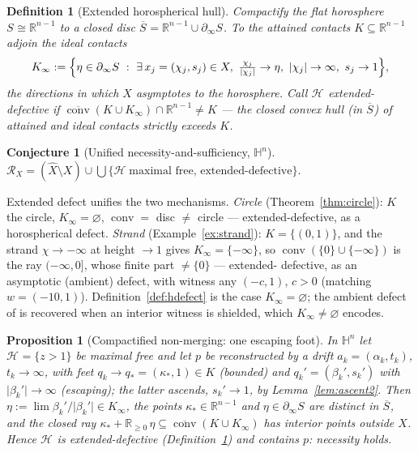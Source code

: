 \documentclass[11pt]{article}
\newtheorem{proposition}[theorem]{Proposition}
\newtheorem{definition}[theorem]{Definition}
\newtheorem{conjecture}[theorem]{Conjecture}
\theoremstyle{remark}
\newcommand{\R}{\mathbb{R}}
\newcommand{\X}{X}
\newcommand{\Xhat}{\widehat{\X}}
\newcommand{\Rx}{\mathcal{R}_{\X}}
\newcommand{\Hb}[1]{\mathcal{H}_{#1}}
\newcommand{\Sb}[1]{S_{#1}}
\begin{document}
\begin{definition}[Extended horospherical hull]\label{def:exthull}
Compactify the flat horosphere $\Sb{}\cong\R^{n-1}$ to a closed disc
$\overline{\Sb{}}=\R^{n-1}\cup\partial_{\infty}\Sb{}$. To the attained
contacts $K\subseteq\R^{n-1}$ adjoin the \emph{ideal contacts}
\[
K_{\infty}:=\Bigl\{\eta\in\partial_{\infty}\Sb{}\ :\ \exists\,
x_{j}=(\chi_{j},s_{j})\in\X,\ \tfrac{\chi_{j}}{\lvert\chi_{j}\rvert}
\to\eta,\ \lvert\chi_{j}\rvert\to\infty,\ s_{j}\to1\Bigr\},
\]
the directions in which $\X$ asymptotes to the horosphere. Call
$\Hb{}$ \emph{extended-defective} if
$\overline{\operatorname{conv}}(K\cup K_{\infty})\cap\R^{n-1}\neq K$
--- the closed convex hull (in $\overline{\Sb{}}$) of attained and
ideal contacts strictly exceeds $K$.
\end{definition}

\begin{conjecture}[Unified necessity-and-sufficiency, $\mathbb{H}^{n}$]
\label{conj:unified}
$\displaystyle \Rx=(\Xhat\setminus\X)\cup\bigcup\{\Hb{}\ \text{maximal
free, extended-defective}\}.$
\end{conjecture}

Extended defect unifies the two mechanisms. \emph{Circle}
(Theorem~\ref{thm:circle}): $K$ the circle, $K_{\infty}=\varnothing$,
$\operatorname{conv}=$ disc $\neq$ circle --- extended-defective, as a
horospherical defect. \emph{Strand} (Example~\ref{ex:strand}):
$K=\{(0,1)\}$, and the strand $\chi\to-\infty$ at height $\to1$ gives
$K_{\infty}=\{-\infty\}$, so $\operatorname{conv}(\{0\}\cup\{-\infty\})$
is the ray $(-\infty,0]$, whose finite part $\neq\{0\}$ --- extended-
defective, as an asymptotic (ambient) defect, with witness any
$(-c,1)$, $c>0$ (matching $w=(-10,1)$). Definition~\ref{def:hdefect}
is the case $K_{\infty}=\varnothing$; the ambient defect of
\cite[Thm.~4.1]{R1} is recovered when an interior witness is
shielded, which $K_{\infty}\neq\varnothing$ encodes.

\begin{proposition}[Compactified non-merging: one escaping foot]
\label{prop:compactnonmerge}
In $\mathbb{H}^{n}$ let $\Hb{}=\{z>1\}$ be maximal free and let $p$ be
reconstructed by a drift $a_{k}=(\alpha_{k},t_{k})$, $t_{k}\to\infty$,
with feet $q_{k}\to q_{\ast}=(\kappa_{\ast},1)\in K$ \emph{(bounded)}
and $q_{k}'=(\beta_{k}',s_{k}')$ with $\lvert\beta_{k}'\rvert\to\infty$
\emph{(escaping)}; the latter ascends, $s_{k}'\to1$, by
Lemma~\ref{lem:ascent2}. Then
$\eta:=\lim\beta_{k}'/\lvert\beta_{k}'\rvert\in K_{\infty}$, the points
$\kappa_{\ast}\in\R^{n-1}$ and $\eta\in\partial_{\infty}\Sb{}$ are
distinct in $\overline{\Sb{}}$, and the closed ray
$\kappa_{\ast}+\R_{\ge0}\,\eta\subseteq\overline{\operatorname{conv}}
(K\cup K_{\infty})$ has interior points outside $\X$. Hence $\Hb{}$ is
extended-defective (Definition~\ref{def:exthull}) and contains $p$:
necessity holds.
\end{proposition}
\end{document}
